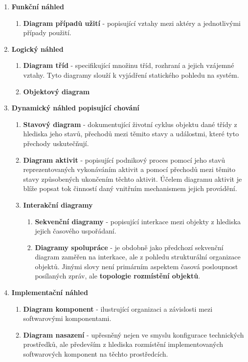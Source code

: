 \begin{enumerate}
	\item \textbf{Funkční náhled}
	\begin{enumerate}
		\item \textbf{Diagram případů užití} - popisující vztahy mezi aktéry a jednotlivými případy použití. 
	\end{enumerate}
	\item \textbf{Logický náhled}
	\begin{enumerate}
		\item \textbf{Diagram tříd} - specifikující množinu tříd, rozhraní a jejich vzájemné vztahy. Tyto diagramy slouží k vyjádření statického pohledu na systém.
		\item \textbf{Objektový diagram}
	\end{enumerate}
	\item \textbf{Dynamický náhled popisující chování}
	\begin{enumerate}
		\item \textbf{Stavový diagram} - dokumentující životní cyklus objektu dané třídy z hlediska jeho stavů, přechodů mezi těmito stavy a událostmi, které tyto přechody uskutečňují. 
		\item \textbf{Diagram aktivit} -  popisující podnikový proces pomocí jeho stavů reprezentovaných vykonáváním aktivit a pomocí přechodů mezi těmito stavy způsobených ukončením těchto aktivit. Účelem diagramu aktivit je blíže popsat tok činností daný vnitřním
		mechanismem jejich provádění. 
		\item \textbf{Interakční diagramy}
		\begin{enumerate}
			\item \textbf{Sekvenční diagramy} -  popisující interkace mezi objekty z hlediska jejich časového uspořádaní.
			\item \textbf{Diagramy spolupráce} -  je obdobně jako předchozí sekvenční diagram zaměřen na interkace, ale z pohledu strukturální organizace objektů. Jinými slovy není primárním aspektem časová posloupnost posílaných zpráv, ale \textbf{topologie rozmístění objektů}. 
		\end{enumerate}
	\end{enumerate}
	\item \textbf{Implementační náhled}
	\begin{enumerate}
		\item \textbf{Diagram komponent} - ilustrující organizaci a závislosti mezi softwarovými komponentami. 
		\item \textbf{Diagram nasazení} - upřesněný nejen ve smyslu konfigurace technických prostředků, ale především z hlediska rozmístění implementovaných softwarových komponent na těchto prostředcích.
	\end{enumerate}
\end{enumerate}

